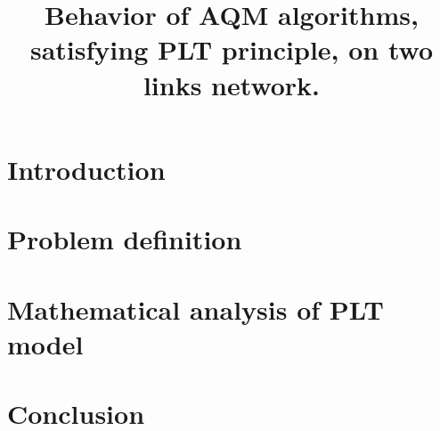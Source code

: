 \documentclass{sig-alternate}
\title{Behavior of AQM algorithms, satisfying PLT principle, on two links network.}
\begin{document}
\maketitle
\section{Introduction}

\section{Problem definition}

% 
\section{Mathematical analysis of PLT model}

% 
\section{Conclusion}



\end{document}
